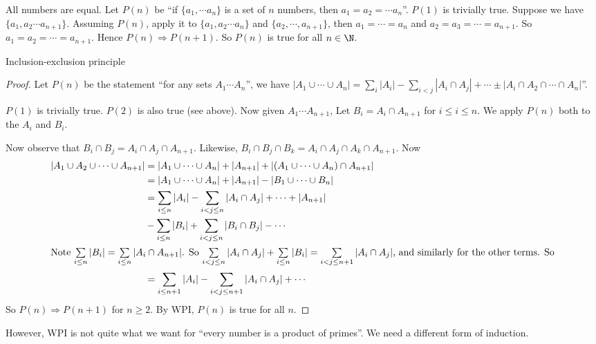\documentclass[a4paper]{article}
\begin{document}
\begin{eg}
  All numbers are equal. Let $P(n)$ be ``if $\{a_1, \cdots a_n\}$ is a set of $n$ numbers, then $a_1 = a_2 = \cdots a_n$''. $P(1)$  is trivially true. Suppose we have $\{a_1, a_2\cdots a_{n+1}\}$. Assuming $P(n)$, apply it to $\{a_1, a_2\cdots a_n\}$ and $\{a_2, \cdots , a_{n + 1}\}$, then $a_1 = \cdots = a_n$ and $a_2 = a_3 = \cdots = a_{n + 1}$. So $a_1 = a_2 = \cdots = a_{n + 1}$. Hence $P(n)\Rightarrow P(n + 1)$. So $P(n)$ is true for all $n\in \N$.
\end{eg}

\begin{thm}
  Inclusion-exclusion principle
\end{thm}

\begin{proof}
  Let $P(n)$ be the statement ``for any sets $A_1\cdots A_n$'', we have $|A_1\cup \cdots \cup A_n| = \sum_i|A_i| - \sum_{i < j} |A_i\cap A_j| + \cdots \pm |A_i\cap A_2\cap \cdots \cap A_n|$''.

  $P(1)$ is trivially true. $P(2)$ is also true (see above). Now given $A_1 \cdots A_{n + 1}$, Let $B_i = A_i\cap A_{n + 1}$  for $i \leq i\leq n$. We apply $P(n)$ both to the $A_i$ and $B_i$.

  Now observe that $B_i\cap B_j = A_i\cap A_j \cap A_{n + 1}$. Likewise, $B_i\cap B_j\cap B_k = A_i\cap A_j\cap A_k\cap A_{n + 1}$. Now
  \begin{align*}
    |A_1\cup A_2\cup \cdots \cup A_{n + 1}| &= |A_1\cup \cdots \cup A_n| + |A_{n + 1}| + |(A_1\cup\cdots\cup A_n)\cap A_{n + 1}|\\
    &= |A_1\cup \cdots \cup A_n| + |A_{n + 1}| - |B_{1}\cup \cdots \cup B_n|\\
    &= \sum_{i\leq n}|A_i| - \sum_{i < j\leq n}|A_i\cap A_j| + \cdots + |A_{n + 1}| \\
    &-\sum_{i \leq n}|B_i| + \sum_{i < j\leq n}|B_i\cap B_j| - \cdots \\
    \intertext{Note $\sum\limits_{i\leq n}|B_i| = \sum\limits_{i\leq n}|A_i\cap A_{n + 1}|$. So $\sum\limits_{i < j\leq n}|A_i\cap A_j| + \sum\limits_{i\leq n}|B_i| = \sum\limits_{i< j \leq n + 1}|A_i \cap A_j|$, and similarly for the other terms. So}
    &= \sum_{i \leq n + 1}|A_i| - \sum_{i< j \leq n + 1}|A_i \cap A_j| + \cdots
  \end{align*}
  So $P(n)\Rightarrow P(n + 1)$ for $n\geq 2$. By WPI, $P(n)$ is true for all $n$.
\end{proof}

However, WPI is not quite what we want for ``every number is a product of primes''. We need a different form of induction.
\end{document}
